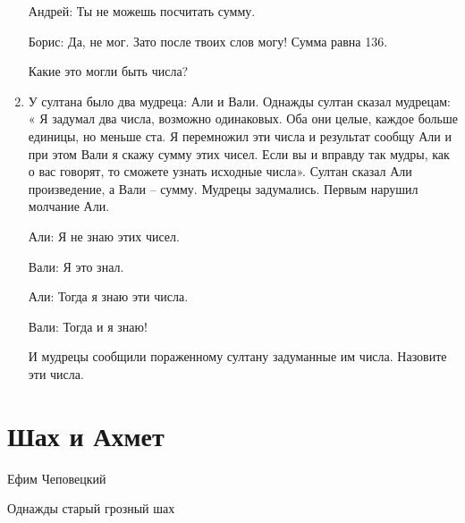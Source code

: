 \documentclass[12pt]{article}
\theoremstyle{definition}
\begin{document}
\begin{enumerate}
Андрей: Ты не можешь посчитать сумму.

Борис: Да, не мог. Зато после твоих слов могу! Сумма равна 136. 

Какие это могли быть числа?

\begin{comment}
\item Два детектива расследуют Загадочное убийство. 

Возможны девять вариантов:

\begin{tabular}{cccccccccc}
\toprule
Вариант & А & Б & В & Г & Д & Е & Ё & Ж & З \\
\midrule
Место & Москва & Москва & Москва & Москва & Москва & Москва & Москва & Москва & Москва & \\
Погода & Москва & Москва & Москва & Москва & Москва & Москва & Москва & Москва & Москва & \\
Орудие & Москва & Москва & Москва & Москва & Москва & Москва & Москва & Москва & Москва & \\
\bottomrule
\end{tabular}
\end{comment}




\item У султана было два мудреца: Али и Вали. Однажды султан сказал мудрецам: «
Я задумал два числа, возможно одинаковых. 
Оба они целые, каждое больше единицы, но меньше ста. 
Я перемножил эти числа и результат сообщу Али и при этом Вали я скажу сумму этих чисел. 
Если вы и вправду так мудры, как о вас говорят, то сможете узнать исходные числа».
Султан сказал Али произведение, а Вали – сумму. Мудрецы задумались. Первым нарушил молчание Али.

Али: Я не знаю этих чисел.

Вали: Я это знал.

Али: Тогда я знаю эти числа.

Вали: Тогда и я знаю! 

И мудрецы сообщили пораженному султану задуманные им числа. Назовите эти числа.

\end{enumerate}

\section{Шах и Ахмет}

Ефим Чеповецкий

Однажды старый грозный шах
\end{document}
